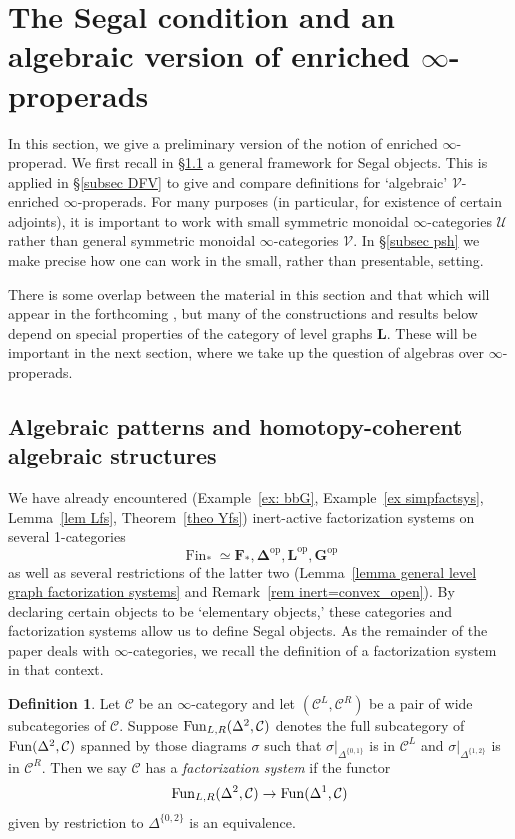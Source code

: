 \documentclass{amsart}
\numberwithin{theorem}{subsection}
\theoremstyle{definition}
\newtheorem{definition}[theorem]{Definition}
\providecommand{\op}{\mathrm{op}}
\newcommand{\finset}{\operatorname{Fin}}
\newcommand{\pfinset}{\finset_*}
\newcommand{\finsetskel}{\mathbf{F}}
\newcommand{\pfinsetskel}{\finsetskel_*}
\newcommand{\xcc}{\mathcal{C}}
\newcommand{\xU}{\mathcal{U}}
\newcommand{\xV}{\mathcal{V}}
\newcommand{\name}[1]{\ensuremath{\text{\textup{#1}}}}
\newcommand{\simp}{\mathbf{\Delta}}
\newcommand{\levelg}{\mathbf{L}}
\newcommand{\bbY}{\mathbf{G}}
\newcommand{\Fun}{\name{Fun}}
\begin{document}
\section{The Segal condition and an algebraic version of enriched \texorpdfstring{$\infty$}{∞}-properads}\label{sec segal presheaves}

In this section, we give a preliminary version of the notion of enriched $\infty$-properad.
We first recall in \S\ref{subsection hcas} a general framework for Segal objects.
This is applied in \S\ref{subsec DFV} to give and compare definitions for `algebraic' $\xV$-enriched $\infty$-properads.
For many purposes (in particular, for existence of certain adjoints), it is important to work with small symmetric monoidal $\infty$-categories $\xU$ rather than general symmetric monoidal $\infty$-categories $\xV$.
In \S\ref{subsec psh} we make precise how one can work in the small, rather than presentable, setting.

There is some overlap between the material in this section and that which will appear in the forthcoming \cite{patterns3}, but many of the constructions and results below depend on special properties of the category of level graphs $\levelg$. 
These will be important in the next section, where we take up the question of algebras over $\infty$-properads.


\subsection{Algebraic patterns and homotopy-coherent algebraic structures}\label{subsection hcas}
We have already encountered (Example~\ref{ex: bbG}, Example~\ref{ex simpfactsys}, Lemma~\ref{lem Lfs}, Theorem~\ref{theo Yfs}) inert-active factorization systems on several 1-categories
\[
\pfinset \simeq \pfinsetskel, \simp^\op, \levelg^\op, \bbY^\op
\]
as well as several restrictions of the latter two (Lemma~\ref{lemma general level graph factorization systems} and Remark~\ref{rem inert=convex_open}).
By declaring certain objects to be `elementary objects,' these categories and factorization systems allow us to define Segal objects.
As the remainder of the paper deals with $\infty$-categories, we recall the definition of a factorization system in that context.

\begin{definition}\label{definition inf cat factorization system}
	Let $\xcc$ be an $\infty$-category and let $(\xcc^{L}, \xcc^{R})$ be a pair of wide subcategories of $\xcc$. Suppose $\Fun_{L,R}(\Delta^{2},\xcc)$ denotes the full subcategory of $\Fun(\Delta^{2},\xcc)$ spanned by those diagrams $\sigma$ such that $\sigma|_{\Delta^{\{0,1\}}}$ is in $\xcc^{L}$ and $\sigma|_{\Delta^{\{1,2\}}}$ is in $\xcc^{R}$. Then we say $\xcc$ has a \emph{factorization system} if the functor
	\[ \Fun_{L,R}(\Delta^{2},\xcc) \to
	\Fun(\Delta^{1},\xcc) \] given by restriction to $\Delta^{\{0,2\}}$ is an equivalence.
\end{definition}
\end{document}
